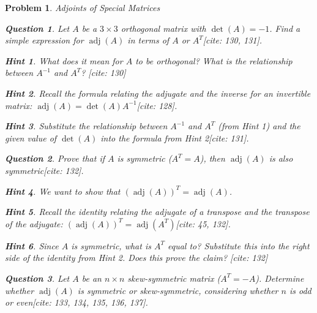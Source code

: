 \documentclass[12pt]{article}
\newtheorem{problem}{Problem}[section]
\newtheorem{question}{Question}[problem]
\theoremstyle{definition}
\newtheorem{hint}{Hint}[question]
\newcommand{\adj}{\operatorname{adj}}
\newcommand{\detm}{\operatorname{det}}
\begin{document}
\begin{problem}{Adjoints of Special Matrices}
    \begin{question}
        Let $A$ be a $3 \times 3$ orthogonal matrix with $\detm(A)=-1$. Find a simple expression for $\adj(A)$ in terms of $A$ or $A^T$[cite: 130, 131].
    \end{question}
    
        \begin{hint}
            What does it mean for $A$ to be orthogonal? What is the relationship between $A^{-1}$ and $A^T$? [cite: 130]
        \end{hint}
        \begin{hint}
            Recall the formula relating the adjugate and the inverse for an invertible matrix: $\adj(A) = \detm(A) A^{-1}$[cite: 128].
        \end{hint}
        \begin{hint}
            Substitute the relationship between $A^{-1}$ and $A^T$ (from Hint 1) and the given value of $\detm(A)$ into the formula from Hint 2[cite: 131].
        \end{hint}
    

    \begin{question}
        Prove that if $A$ is symmetric ($A^T=A$), then $\adj(A)$ is also symmetric[cite: 132].
    \end{question}
    
        \begin{hint}
            We want to show that $(\adj(A))^T = \adj(A)$.
        \end{hint}
        \begin{hint}
            Recall the identity relating the adjugate of a transpose and the transpose of the adjugate: $(\adj(A))^T = \adj(A^T)$[cite: 45, 132].
        \end{hint}
        \begin{hint}
            Since $A$ is symmetric, what is $A^T$ equal to? Substitute this into the right side of the identity from Hint 2. Does this prove the claim? [cite: 132]
        \end{hint}
    

    \begin{question}
        Let $A$ be an $n \times n$ skew-symmetric matrix ($A^T = -A$). Determine whether $\adj(A)$ is symmetric or skew-symmetric, considering whether $n$ is odd or even[cite: 133, 134, 135, 136, 137].
    \end{question}
    

\end{problem}
\end{document}
